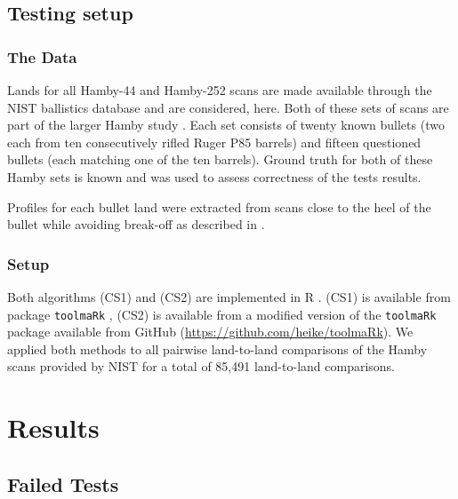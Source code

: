 \documentclass[12pt]{article}
\begin{document}
\hypertarget{testing-setup}{%
\subsection{Testing setup}\label{testing-setup}}

\hypertarget{the-data}{%
\subsubsection{The Data}\label{the-data}}

Lands for all Hamby-44 and Hamby-252 scans are made available through
the NIST ballistics database \citep{nist} and are considered, here. Both
of these sets of scans are part of the larger Hamby study \citep{hamby}.
Each set consists of twenty known bullets (two each from ten
consecutively rifled Ruger P85 barrels) and fifteen questioned bullets
(each matching one of the ten barrels). Ground truth for both of these
Hamby sets is known and was used to assess correctness of the tests
results.

Profiles for each bullet land were extracted from scans close to the
heel of the bullet while avoiding break-off as described in
\citet{aoas}.

\hypertarget{setup}{%
\subsubsection{Setup}\label{setup}}

Both algorithms (CS1) and (CS2) are implemented in R \citep{R}. (CS1) is
available from package \texttt{toolmaRk} \citep{toolmark}, (CS2) is
available from a modified version of the \texttt{toolmaRk} package
available from GitHub (\url{https://github.com/heike/toolmaRk}). We
applied both methods to all pairwise land-to-land comparisons of the
Hamby scans provided by NIST for a total of 85,491 land-to-land
comparisons.

\hypertarget{results}{%
\section{Results}\label{results}}

\hypertarget{failed-tests}{%
\subsection{Failed Tests}\label{failed-tests}}
\end{document}
